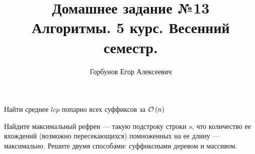 

\title{Домашнее задание №13 \\ Алгоритмы. 5 курс. Весенний семестр.}
\author{Горбунов Егор Алексеевич}


\maketitle

\begin{task}[1]
Найти среднее $lcp$ попарно всех суффиксов за $\mathcal{O}\left(n\right)$
\end{task}
\begin{solution}
\end{solution}

\begin{task}[3]
Найдите максимальный рефрен --- такую подстроку строки $s$, что количество
ее вхождений (возможно пересекающихся) помноженных на ее длину --- максимально. Решите
двумя способами: суффиксными деревом и массивом.
\end{task}
